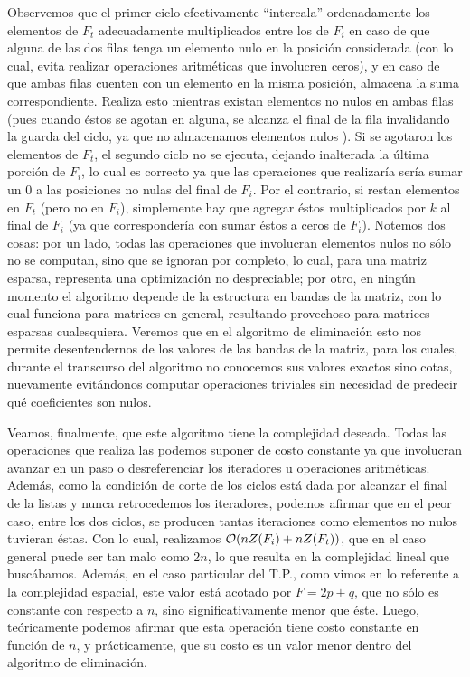  Observemos que el primer ciclo efectivamente ``intercala'' ordenadamente los elementos de $F_t$ adecuadamente multiplicados entre los de $F_i$ en caso de que alguna de las dos filas tenga un elemento nulo en la posición considerada (con lo cual, evita realizar operaciones aritméticas que involucren ceros), y en caso de que ambas filas cuenten con un elemento en la misma posición, almacena la suma correspondiente. Realiza esto mientras existan elementos no nulos en ambas filas (pues cuando éstos se agotan en alguna, se alcanza el final de la fila invalidando la guarda del ciclo, ya que no almacenamos elementos nulos ). Si se agotaron los elementos de $F_t$, el segundo ciclo no se ejecuta, dejando inalterada la última porción de $F_i$, lo cual es correcto ya que las operaciones que realizaría sería sumar un $0$ a las posiciones no nulas del final de $F_i$. Por el contrario, si restan elementos en $F_t$ (pero no en $F_i$), simplemente hay que agregar éstos multiplicados por $k$ al final de $F_i$ (ya que correspondería con sumar éstos a ceros de $F_i$). Notemos dos cosas: por un lado, todas las operaciones que involucran elementos nulos no sólo no se computan, sino que se ignoran por completo, lo cual, para una matriz esparsa, representa una optimización no despreciable; por otro, en ningún momento el algoritmo depende de la estructura en bandas de la matriz, con lo cual funciona para matrices en general, resultando provechoso para matrices esparsas cualesquiera. Veremos que en el algoritmo de eliminación esto nos permite desentendernos de los valores de las bandas de la matriz, para los cuales, durante el transcurso del algoritmo no conocemos sus valores exactos sino cotas, nuevamente evitándonos computar operaciones triviales sin necesidad de predecir qué coeficientes son nulos.
 
 Veamos, finalmente, que este algoritmo tiene la complejidad deseada. Todas las operaciones que realiza las podemos suponer de costo constante ya que involucran avanzar en un paso o desreferenciar los iteradores u operaciones aritméticas. Además, como la condición de corte de los ciclos está dada por alcanzar el final de la listas y nunca retrocedemos los iteradores, podemos afirmar que en el peor caso, entre los dos ciclos, se producen tantas iteraciones como elementos no nulos tuvieran éstas. Con lo cual, realizamos $\mathcal{O}(nZ(F_i) + nZ(F_t))$, que en el caso general puede ser tan malo como $2n$, lo que resulta en la complejidad lineal que buscábamos. Además, en el caso particular del T.P., como vimos en lo referente a la complejidad espacial, este valor está acotado por $F = 2p+q$, que no sólo es constante con respecto a $n$, sino significativamente menor que éste. Luego, teóricamente podemos afirmar que esta operación tiene costo constante en función de $n$, y prácticamente, que su costo es un valor menor dentro del algoritmo de eliminación. 

